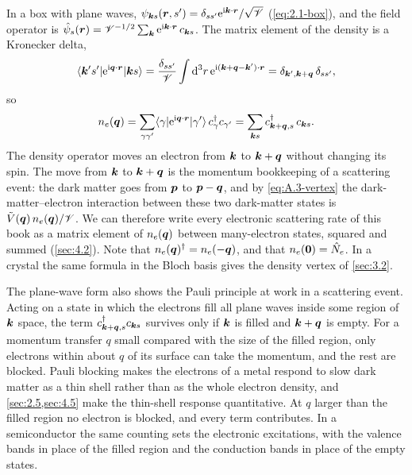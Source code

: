 In a box with plane waves, $\psi_{\bm{k}s}(\bm{r}, s') = \delta_{ss'}\mathrm{e}^{\mathrm{i}\bm{k}\cdot\bm{r}}/\sqrt{\mathscr{V}}$ (\cref{eq:2.1-box}), and the field operator is $\hat{\psi}_s(\bm{r}) = \mathscr{V}^{-1/2}\sum_{\bm{k}}\mathrm{e}^{\mathrm{i}\bm{k}\cdot\bm{r}}\,c_{\bm{k}s}$. The matrix element of the density is a Kronecker delta,
\begin{equation*}
  \langle\bm{k}'s'|\mathrm{e}^{\mathrm{i}\bm{q}\cdot\bm{r}}|\bm{k}s\rangle = \frac{\delta_{ss'}}{\mathscr{V}}\int\mathrm{d}^3r\,\mathrm{e}^{\mathrm{i}(\bm{k} + \bm{q} - \bm{k}')\cdot\bm{r}} = \delta_{\bm{k}',\bm{k}+\bm{q}}\,\delta_{ss'} ,
\end{equation*}
so
\begin{equation}
  n_e(\bm{q}) = \sum_{\gamma\gamma'}\langle\gamma|\mathrm{e}^{\mathrm{i}\bm{q}\cdot\bm{r}}|\gamma'\rangle\,c^\dagger_\gamma c_{\gamma'}
  = \sum_{\bm{k}s}c^\dagger_{\bm{k}+\bm{q},s}\,c_{\bm{k}s} .
  \label{eq:2.3-nq}
\end{equation}
The density operator moves an electron from $\bm{k}$ to $\bm{k} + \bm{q}$ without changing its spin. The move from $\bm{k}$ to $\bm{k} + \bm{q}$ is the momentum bookkeeping of a scattering event: the dark matter goes from $\bm{p}$ to $\bm{p} - \bm{q}$, and by \cref{eq:A.3-vertex} the dark-matter--electron interaction between these two dark-matter states is $\tilde V(\bm{q})\,n_e(\bm{q})/\mathscr{V}$. We can therefore write every electronic scattering rate of this book as a matrix element of $n_e(\bm{q})$ between many-electron states, squared and summed (\cref{sec:4.2}). Note that $n_e(\bm{q})^\dagger = n_e(-\bm{q})$, and that $n_e(\bm{0}) = \hat{N}_e$. In a crystal the same formula in the Bloch basis gives the density vertex of \cref{sec:3.2}.

The plane-wave form also shows the Pauli principle at work in a scattering event. Acting on a state in which the electrons fill all plane waves inside some region of $\bm{k}$ space, the term $c^\dagger_{\bm{k}+\bm{q},s}c_{\bm{k}s}$ survives only if $\bm{k}$ is filled and $\bm{k} + \bm{q}$ is empty. For a momentum transfer $q$ small compared with the size of the filled region, only electrons within about $q$ of its surface can take the momentum, and the rest are blocked. Pauli blocking makes the electrons of a metal respond to slow dark matter as a thin shell rather than as the whole electron density, and \cref{sec:2.5,sec:4.5} make the thin-shell response quantitative. At $q$ larger than the filled region no electron is blocked, and every term contributes. In a semiconductor the same counting sets the electronic excitations, with the valence bands in place of the filled region and the conduction bands in place of the empty states.

